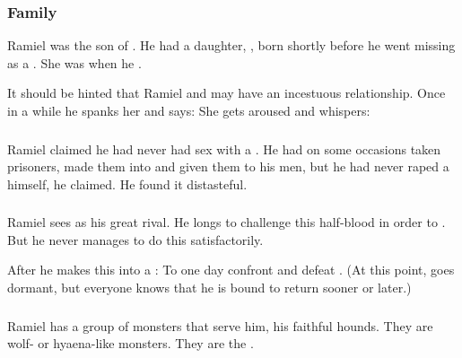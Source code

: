 \subsubsection{Family}
Ramiel was the son of . 
He had a daughter, , born shortly before he went missing as a \malach. 
She was  when he . 

It should be hinted that Ramiel and \Cishiel may have an incestuous relationship. 
Once in a while he spanks her and says: 
She gets aroused and whispers: 





\subsubsection{\Yurideth}
Ramiel claimed he had never had sex with a .
He had on some occasions taken prisoners, made them into \yurideth and given them to his men, but he had never raped a \yurid himself, he claimed.
He found it distasteful.





\subsubsection{\Vizsherioch}
Ramiel sees \Vizsherioch{} as his great rival. 
He longs to challenge this half-blood \xs{} in order to . 
But he never manages to do this satisfactorily. 

After  he makes this into a : To one day confront and defeat \Vizsherioch. 
(At this point, \Vizsherioch{} goes dormant, but everyone knows that he is bound to return sooner or later.) 





\subsubsection{\Vorcanth}
Ramiel has a group of monsters that serve him, his faithful hounds. 
They are wolf- or hyaena-like monsters. 
They are the . 

